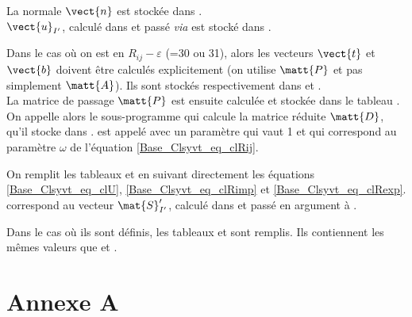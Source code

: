 La normale $\vect{n}$ est stock\'ee dans .\\
$\vect{u}_{I'}$, calcul\'e dans  et pass\'e {\em via} 
est stock\'e dans .

Dans le cas o\`u on est en $R_{ij}-\varepsilon$ (=30 ou 31),
alors les
vecteurs $\vect{t}$ et $\vect{b}$ doivent \^etre calcul\'es explicitement
(on utilise $\matt{P}$ et pas simplement $\matt{A}$).
Ils sont stock\'es respectivement dans  et
.\\
La matrice de passage $\matt{P}$ est ensuite calcul\'ee et stock\'ee dans le
tableau .\\
On appelle alors le sous-programme  qui calcule la matrice
r\'eduite $\matt{D}$, qu'il stocke dans .  est appel\'e
avec un param\`etre  qui vaut 1 et qui correspond au param\`etre
$\omega$ de l'\'equation \ref{Base_Clsyvt_eq_clRij}.


On remplit les tableaux  et  en suivant directement les
\'equations \ref{Base_Clsyvt_eq_clU}, \ref{Base_Clsyvt_eq_clRimp} et \ref{Base_Clsyvt_eq_clRexp}.\\
 correspond au vecteur $\mat{S}_{I'}^\prime$, calcul\'e dans
 et pass\'e en argument \`a .

Dans le cas o\`u ils sont d\'efinis, les tableaux  et 
sont remplis. Ils contiennent les m\^emes valeurs que  et
.


\section{Annexe A}

